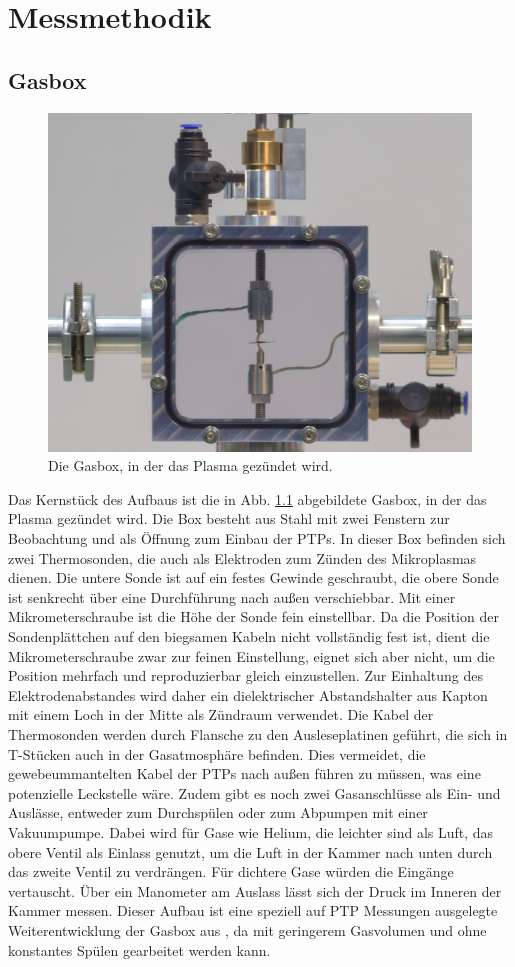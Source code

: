 \chapter{Messmethodik}
\section{Gasbox}

\begin{figure}[h]
	\centering
	\includegraphics[width=0.8\linewidth]{bilder/gasbox_kleiner.png}
	\caption{Die Gasbox, in der das Plasma gezündet wird.}
	\label{fig:gasbox}
\end{figure}


Das Kernstück des Aufbaus ist die in Abb. \ref{fig:gasbox} abgebildete Gasbox, in der das Plasma gezündet wird. Die Box besteht aus Stahl mit zwei Fenstern zur Beobachtung und als Öffnung zum Einbau der PTPs. In dieser Box befinden sich zwei Thermosonden, die auch als Elektroden zum Zünden des Mikroplasmas dienen. Die untere Sonde ist auf ein festes Gewinde geschraubt, die obere Sonde ist senkrecht über eine Durchführung nach außen verschiebbar. Mit einer Mikrometerschraube ist die Höhe der Sonde fein einstellbar. Da die Position der Sondenplättchen auf den biegsamen Kabeln nicht vollständig fest ist, dient die Mikrometerschraube zwar zur feinen Einstellung, eignet sich aber nicht, um die Position mehrfach und reproduzierbar gleich einzustellen. Zur Einhaltung des Elektrodenabstandes wird daher ein dielektrischer Abstandshalter aus Kapton mit einem Loch in der Mitte als Zündraum verwendet. Die Kabel der Thermosonden werden durch Flansche zu den Ausleseplatinen geführt, die sich in T-Stücken auch in der Gasatmosphäre befinden. Dies vermeidet, die gewebeummantelten Kabel der PTPs nach außen führen zu müssen, was eine potenzielle Leckstelle wäre. Zudem gibt es noch zwei Gasanschlüsse als Ein- und Auslässe, entweder zum Durchspülen oder zum Abpumpen mit einer Vakuumpumpe. Dabei wird für Gase wie Helium, die leichter sind als Luft, das obere Ventil als Einlass genutzt, um die Luft in der Kammer nach unten durch das zweite Ventil zu verdrängen. Für dichtere Gase würden die Eingänge vertauscht. Über ein Manometer am Auslass lässt sich der Druck im Inneren der Kammer messen. Dieser Aufbau ist eine speziell auf PTP Messungen ausgelegte Weiterentwicklung der Gasbox aus \cite{hansenConventionalNonconventionalDiagnostics2022}, da mit geringerem Gasvolumen und ohne konstantes Spülen gearbeitet werden kann.


